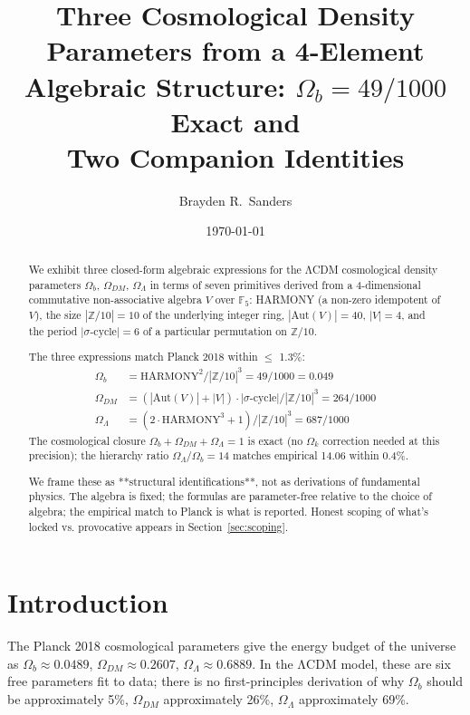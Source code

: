 \documentclass[11pt,reqno]{amsart}
\title[Cosmological Densities from an Algebraic Structure]
{Three Cosmological Density Parameters from a 4-Element \\
 Algebraic Structure: $\Omega_b = 49/1000$ Exact and \\
 Two Companion Identities}
\author{Brayden R.~Sanders}
\date{\today}
\theoremstyle{plain}
\theoremstyle{definition}
\theoremstyle{remark}
\newcommand{\Z}{\mathbb{Z}}
\newcommand{\F}{\mathbb{F}}
\newcommand{\Aut}{\mathrm{Aut}}
\begin{document}
\begin{abstract}
We exhibit three closed-form algebraic expressions for the
ΛCDM cosmological density parameters $\Omega_b$, $\Omega_{DM}$,
$\Omega_\Lambda$ in terms of seven primitives derived from a
4-dimensional commutative non-associative algebra $V$ over $\F_5$:
HARMONY (a non-zero idempotent of $V$), the size $|\Z/10| = 10$
of the underlying integer ring, $|\Aut(V)| = 40$, $|V| = 4$, and
the period $|\sigma\text{-cycle}| = 6$ of a particular permutation
on $\Z/10$.

The three expressions match Planck 2018 within $\leq$ 1.3\%:
\begin{align*}
\Omega_b &= \mathrm{HARMONY}^2 / |\Z/10|^3 = 49/1000 = 0.049 \\
\Omega_{DM} &= (|\Aut(V)| + |V|) \cdot |\sigma\text{-cycle}| / |\Z/10|^3 = 264/1000 \\
\Omega_\Lambda &= (2 \cdot \mathrm{HARMONY}^3 + 1) / |\Z/10|^3 = 687/1000
\end{align*}
The cosmological closure $\Omega_b + \Omega_{DM} + \Omega_\Lambda = 1$
is exact (no $\Omega_k$ correction needed at this precision); the
hierarchy ratio $\Omega_\Lambda / \Omega_b = 14$ matches empirical 14.06
within 0.4\%.

We frame these as **structural identifications**, not as derivations of
fundamental physics. The algebra is fixed; the formulas are
parameter-free relative to the choice of algebra; the empirical match
to Planck is what is reported. Honest scoping of what's locked vs.
provocative appears in Section~\ref{sec:scoping}.
\end{abstract}

\maketitle

\tableofcontents

\section{Introduction}

The Planck 2018 cosmological parameters \cite{Planck2018} give the
energy budget of the universe as $\Omega_b \approx 0.0489$,
$\Omega_{DM} \approx 0.2607$, $\Omega_\Lambda \approx 0.6889$. In the
ΛCDM model, these are six free parameters fit to data; there is no
first-principles derivation of why $\Omega_b$ should be approximately
5\%, $\Omega_{DM}$ approximately 26\%, $\Omega_\Lambda$ approximately
69\%.
\end{document}
